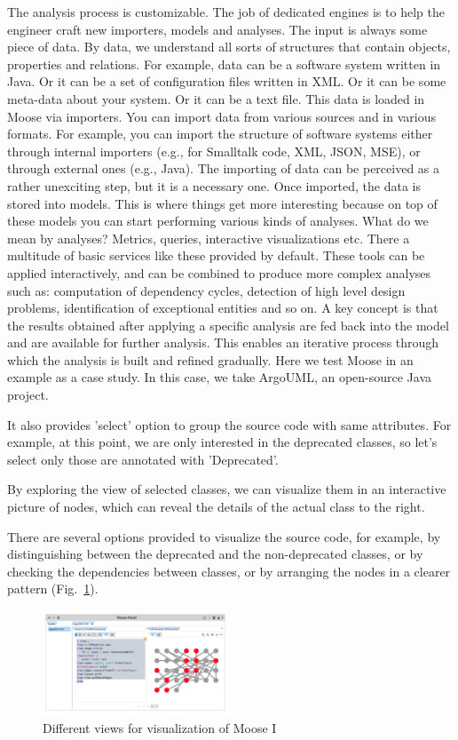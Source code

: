 \documentclass{sig-alternate}
\begin{document}
The analysis process is customizable. The job of dedicated engines is to help the engineer craft new importers, models and analyses.
The input is always some piece of data. By data, we understand all sorts of structures that contain objects, properties and relations. For example, data can be a software system written in Java. Or it can be a set of configuration files written in XML. Or it can be some meta-data about your system. Or it can be a text file.
This data is loaded in Moose via importers. You can import data from various sources and in various formats. For example, you can import the structure of software systems either through internal importers (e.g., for Smalltalk code, XML, JSON, MSE), or through external ones (e.g., Java).
The importing of data can be perceived as a rather unexciting step, but it is a necessary one. Once imported, the data is stored into models. This is where things get more interesting because on top of these models you can start performing various kinds of analyses.
What do we mean by analyses? Metrics, queries, interactive visualizations etc. There a multitude of basic services like these provided by default. These tools can be applied interactively, and can be combined to produce more complex analyses such as: computation of dependency cycles, detection of high level design problems, identification of exceptional entities and so on. A key concept is that the results obtained after applying a specific analysis are fed back into the model and are available for further analysis. This enables an iterative process through which the analysis is built and refined gradually.
Here we test Moose in an example as a case study. In this case, we take ArgoUML, an open-source Java project.

It also provides 'select' option to group the source code with same attributes. For example, at this point, we are only interested in the deprecated classes, so let's select only those are annotated with 'Deprecated'.

By exploring the view of selected classes, we can visualize them in an interactive picture of nodes, which can reveal the details of the actual class to the right.

There are several options provided to visualize the source code, for example, by distinguishing between the deprecated and the non-deprecated classes, or by checking the dependencies between classes, or by arranging the nodes in a clearer pattern (Fig.~\ref{fig:Different views for visualization of Moose I}).

\begin{figure}
\centering
\includegraphics[width=0.5\textwidth]{eva6.png}
\caption{Different views for visualization of Moose I}
\label{fig:Different views for visualization of Moose I}
\end{figure}
\end{document}
